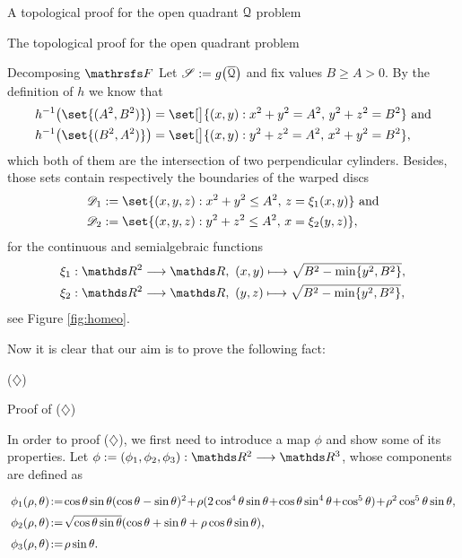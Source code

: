 \documentclass[11pt, a4paper, english, twoside, notitlepage, openright]{report}
\begin{document}
\begin{chapter}{A topological proof for the open quadrant $\mathcal{Q}$ problem}
\begin{section}{The topological proof for the open quadrant problem}
\begin{subsection}{Decomposing $\FFF$}
Let $\mathscr{S}:=g\big(\overline{\mathcal{Q}}\big)$ and fix values $B\ge A>0$. By the definition of $h$ we know that
\begin{align*}
&h^{-1}\big(\set{(A^2,B^2)}\big)=\set[\big]{(x,y): x^2+y^2=A^2,\,y^2+z^2=B^2} \text{ and}\\
&h^{-1}\big(\set{(B^2,A^2)}\big)=\set[\big]{(x,y): y^2+z^2=A^2,\,x^2+y^2=B^2},
\end{align*} 
which both of them are the intersection of two perpendicular cylinders. Besides, those sets contain respectively the boundaries of the warped discs
\begin{align}
&\D_1:= \set{(x,y,z): x^2+y^2\le A^2,\,z=\xi_1(x,y)} \text{ and}\label{d1}\\
&\D_2:= \set{(x,y,z): y^2+z^2\le A^2,\,x=\xi_2(y,z)},\label{d2}
\end{align}
for the continuous and semialgebraic functions
\begin{align}
&\xi_1:\R^2\longrightarrow\R,\ (x,y)\longmapsto\sqrt{B^2-\min\{y^2,B^2\}},\label{xi1}\\
&\xi_2:\R^2\longrightarrow\R,\ (y,z)\longmapsto\sqrt{B^2-\min\{y^2,B^2\}},\label{xi2}
\end{align}
see Figure \ref{fig:homeo}.


Now it is clear that our aim is to prove the following fact:

\begin{center}
 ($\diamondsuit$)
\end{center}

\end{subsection}

\begin{subsection}{Proof of ($\diamondsuit$)}

In order to proof ($\diamondsuit$), we first need to introduce a map $\phi$ and show some of its properties. Let $\phi:=(\phi_1,\phi_2,\phi_3):\R^2\longrightarrow\R^3$, whose components are defined as
$$
\arraycolsep=2pt\def\arraystretch{1.5}
\begin{array}{l}
\phi_1(\rho,\theta)\!:=\!\cos\theta\sin\theta(\cos\theta-
\sin\theta)^2\!+\!\rho(2\cos^4\theta\sin\theta\!+\!\cos\theta\sin^4\theta\!+\!\cos^5\theta)\!+\!\rho^2\cos^5\theta\sin\theta,\\
\phi_2(\rho,\theta)\!:=\!\sqrt{\cos\theta\sin\theta}(\cos\theta+\sin\theta+\rho\cos\theta\sin\theta),\\
\phi_3(\rho,\theta)\!:=\!\rho\sin\theta.
\end{array}
$$


\end{subsection}
\end{section}
\end{chapter}
\end{document}
